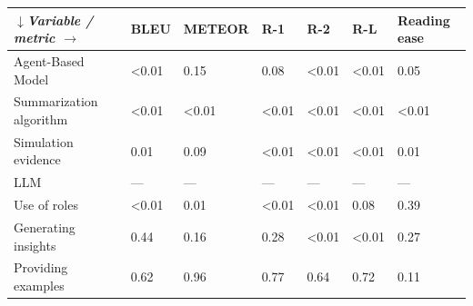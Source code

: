 \begin{tabular}{|l|l|l|l|l|l|l|}
\hline
\textit{$\downarrow$Variable / metric $\rightarrow$} & BLEU & METEOR & R-1 & R-2 & R-L & Reading ease \\
 \hline
 Agent-Based Model & \textless{}0.01 & 0.15 & 0.08 & \textless{}0.01 & \textless{}0.01 & 0.05 \\
 \hline
 Summarization algorithm & \textless{}0.01 & \textless{}0.01 & \textless{}0.01 & \textless{}0.01 & \textless{}0.01 & \textless{}0.01 \\
 \hline
 Simulation evidence & 0.01 & 0.09 & \textless{}0.01 & \textless{}0.01 & \textless{}0.01 & 0.01 \\
 \hline
 LLM & — & — & — & — & — & — \\
 \hline
 Use of roles & \textless{}0.01 & 0.01 & \textless{}0.01 & \textless{}0.01 & 0.08 & 0.39 \\
 \hline
 Generating insights & 0.44 & 0.16 & 0.28 & \textless{}0.01 & \textless{}0.01 & 0.27 \\
 \hline
 Providing examples & 0.62 & 0.96 & 0.77 & 0.64 & 0.72 & 0.11 \\
\hline
\end{tabular}
